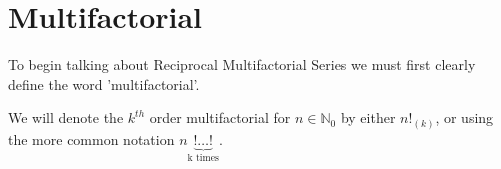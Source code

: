 \documentclass[12pt]{article}
\numberwithin{equation}{section}
\begin{document}

\section{Multifactorial} %

To begin talking about Reciprocal Multifactorial Series  we must first clearly define the word 'multifactorial'.\par
We will denote the $k^{th}$ order multifactorial for $n \in \mathbb{N}_0$  by either $n!_{(k)}$, or using the more common notation $n\underbrace{!\ldots!}_{\text{k times}}$.

\end{document}
